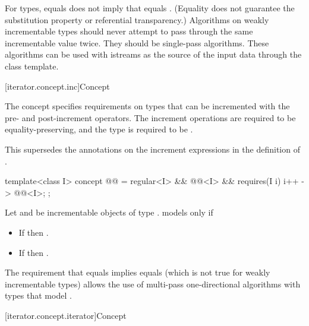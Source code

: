\pnum
\begin{note}
For  types,  equals  does not imply that 
equals . (Equality does not guarantee the substitution property or referential
transparency.) Algorithms on weakly incrementable types should never attempt to pass
through the same incrementable value twice. They should be single-pass algorithms. These algorithms
can be used with istreams as the source of the input data through the  class
template.
\end{note}

[iterator.concept.inc]{Concept }

\pnum
The  concept specifies requirements on types that can be incremented with the pre-
and post-increment operators. The increment operations are required to be equality-preserving,
and the type is required to be .
\begin{note}
This supersedes the annotations on the increment expressions
in the definition of .
\end{note}

\begin{codeblock}
template<class I>
  concept @@ =
    regular<I> &&
    @@<I> &&
    requires(I i) {
      { i++ } -> @@<I>;
    };
\end{codeblock}

\pnum
Let  and  be incrementable objects of type .
 models  only if
\begin{itemize}
\item If  then .
\item If  then .
\end{itemize}

\pnum
\begin{note}
The requirement that
 equals 
implies
 equals 
(which is not true for weakly incrementable types)
allows the use of multi-pass one-directional
algorithms with types that model .
\end{note}

[iterator.concept.iterator]{Concept }

